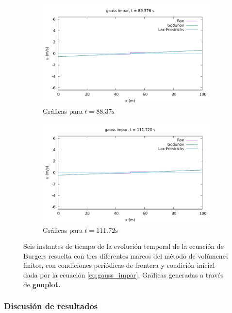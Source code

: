 \documentclass[12pt]{article}
\begin{document}
\begin{figure}[h!]
\begin{subfigure}{0.49\textwidth}
			\includegraphics[width=\textwidth]{../burgers1DVF/results/sol_periodicas/gauss_impar/084.pdf}
			\caption*{Gráficas para $t=88.37\unit{\second}$}
			\label{fig:gauss_impar-perio5}
		\end{subfigure}\hfill
		\begin{subfigure}{0.49\textwidth}
			\centering
			\includegraphics[width=\textwidth]{../burgers1DVF/results/sol_periodicas/gauss_impar/105.pdf}
			\caption*{Gráficas para $t=111.72\unit{\second}$}
			\label{fig:gauss_impar-perio6}
		\end{subfigure}
		\caption{Seis instantes de tiempo de la evolución temporal de  la ecuación de Burgers resuelta con tres diferentes marcos del método de volúmenes finitos, con condiciones periódicas de frontera y condición inicial dada por la ecuación \ref{eq:gauss_impar}. Gráficas generadas a través de \textbf{gnuplot.}}
		\label{fig:gauss_impar-periodica}
	\end{figure}
	\clearpage	
	\subsubsection{Discusión de resultados}
\end{document}
